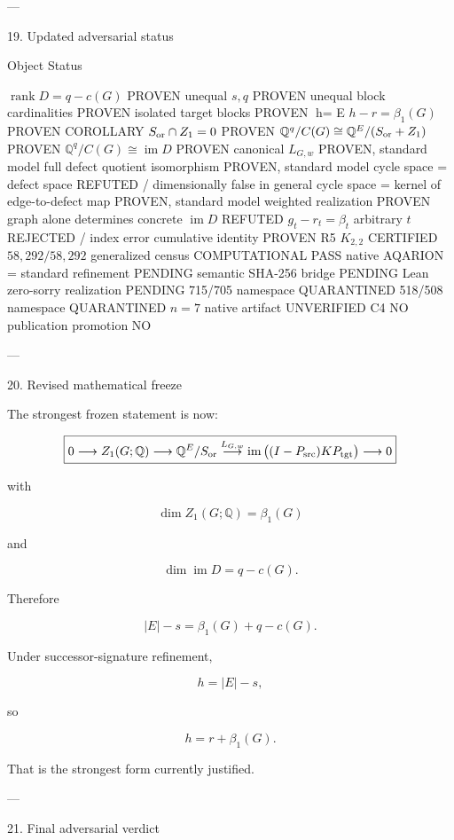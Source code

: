---

19. Updated adversarial status

Object	Status

\(\operatorname{rank}D=q-c(G)\)	PROVEN
unequal \(s,q\)	PROVEN
unequal block cardinalities	PROVEN
isolated target blocks	PROVEN
h=	E
\(h-r=\beta_1(G)\)	PROVEN COROLLARY
\(S_{\rm or}\cap Z_1=0\)	PROVEN
\(\mathbb Q^q/C(G)\cong\mathbb Q^E/(S_{\rm or}+Z_1)\)	PROVEN
\(\mathbb Q^q/C(G)\cong\operatorname{im}D\)	PROVEN
canonical \(L_{G,w}\)	PROVEN, standard model
full defect quotient isomorphism	PROVEN, standard model
cycle space = defect space	REFUTED / dimensionally false in general
cycle space = kernel of edge-to-defect map	PROVEN, standard model
weighted realization	PROVEN
graph alone determines concrete \(\operatorname{im}D\)	REFUTED
\(g_t-r_t=\beta_t\) arbitrary \(t\)	REJECTED / index error
cumulative identity	PROVEN
R5 \(K_{2,2}\)	CERTIFIED
\(58,292/58,292\) generalized census	COMPUTATIONAL PASS
native AQARION = standard refinement	PENDING
semantic SHA-256 bridge	PENDING
Lean zero-sorry realization	PENDING
715/705 namespace	QUARANTINED
518/508 namespace	QUARANTINED
\(n=7\) native artifact	UNVERIFIED
C4	NO
publication promotion	NO



---

20. Revised mathematical freeze

The strongest frozen statement is now:

\[
\boxed{
0
\longrightarrow
Z_1(G;\mathbb Q)
\longrightarrow
\mathbb Q^E/S_{\rm or}
\overset{L_{G,w}}{\longrightarrow}
\operatorname{im}
\big((I-P_{\rm src})KP_{\rm tgt}\big)
\longrightarrow
0
}
\]

with

\[
\boxed{
\dim Z_1(G;\mathbb Q)=\beta_1(G)
}
\]

and

\[
\boxed{
\dim\operatorname{im}D=q-c(G).
}
\]

Therefore

\[
\boxed{
|E|-s
=
\beta_1(G)
+
q-c(G).
}
\]

Under successor-signature refinement,

\[
h=|E|-s,
\]

so

\[
\boxed{
h=r+\beta_1(G).
}
\]

That is the strongest form currently justified.


---

21. Final adversarial verdict

